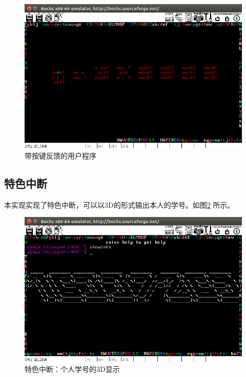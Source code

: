 \documentclass[a4paper]{article}
\begin{document}
\begin{figure}
    \begin{center}
    \includegraphics[scale=0.5]{assets/user.png}
    \caption{带按键反馈的用户程序\label{fig:user}} 
    \end{center} 
\end{figure} 

\subsection{特色中断}
本实现实现了特色中断，可以以3D的形式输出本人的学号。如图\ref{fig:3_D_id}
所示。

\begin{figure}
    \begin{center}
    \includegraphics[scale=0.5]{assets/16337269.png}
    \caption{特色中断：个人学号的3D显示\label{fig:3_D_id}} 
    \end{center} 
\end{figure} 
\end{document}
